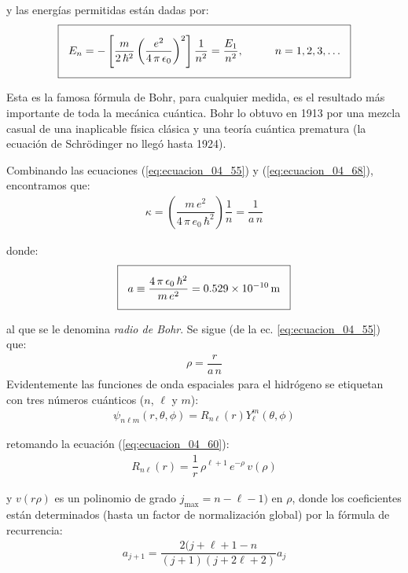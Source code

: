 y las energías permitidas están dadas por:
\begin{align}
\setlength{\fboxsep}{3\fboxsep}\boxed{
E_{n} = - \left[ \dfrac{m}{2 \, \hbar^{2}} \left( \dfrac{e^{2}}{4 \, \pi \, \epsilon_{0}} \right)^{2} \right] \dfrac{1}{n^{2}} = \dfrac{E_{1}}{n^{2}}, \hspace{1cm} n = 1, 2, 3, \ldots}
\label{eq:ecuacion_04_70}
\end{align}

Esta es la famosa fórmula de Bohr, para cualquier medida, es el resultado más importante de toda la mecánica cuántica. Bohr lo obtuvo en 1913 por una mezcla casual de una inaplicable física clásica y una teoría cuántica prematura (la ecuación de Schrödinger no llegó hasta 1924).
\par
Combinando las ecuaciones (\ref{eq:ecuacion_04_55}) y (\ref{eq:ecuacion_04_68}), encontramos que:
\begin{align}
\kappa = \left( \dfrac{m \, e^{2}}{4 \, \pi \, e_{0} \, \hbar^{2}} \right) \dfrac{1}{n} = \dfrac{1}{a \, n}
\label{eq:ecuacion_04_71}
\end{align}

donde:
\begin{align}
\setlength{\fboxsep}{3\fboxsep}\boxed{
a \equiv \dfrac{4 \, \pi \, \epsilon_{0} \, \hbar^{2}}{m \, e^{2}} = \SI{0.529e-10}{\metre}}
\label{eq:ecuacion_04_72}
\end{align}

al que se le denomina \emph{radio de Bohr}. Se sigue (de la ec. \ref{eq:ecuacion_04_55}) que:
\begin{align}
\rho = \dfrac{r}{a \, n}
\label{eq:ecuacion_04_73}
\end{align}
Evidentemente las funciones de onda espaciales para el hidrógeno se etiquetan con tres números cuánticos ($n$, $\ell$ y $m$):
\begin{align}
\psi_{n \ell m} (r, \theta, \phi) =  R_{n \ell} (r) Y_{\ell}^{m} (\theta, \phi)
\label{eq:ecuacion_04_74}
\end{align}

retomando la ecuación (\ref{eq:ecuacion_04_60}):
\begin{align}
R_{n \ell}(r) = \dfrac{1}{r} \, \rho^{\ell + 1} \, e^{-\rho} \, v(\rho)
\label{eq:ecuacion_04_75}
\end{align}

y $v(r\rho)$ es un polinomio de grado $j_{\text{max}} = n - \ell - 1)$ en $\rho$, donde los coeficientes están determinados (hasta un factor de normalización global) por la fórmula de recurrencia:
\begin{align}
a_{j+1} = \dfrac{2 (j + \ell + 1 - n}{(j + 1)(j + 2 \ell + 2)} a_{j}
\label{eq:ecuacion_04_76}
\end{align}

